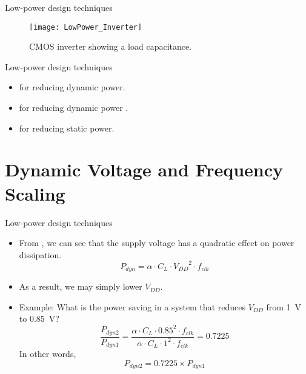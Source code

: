 \documentclass[]{slides}
\begin{document}
\begin{frame}{Low-power design techniques}{}
\begin{figure}
\texttt{[image: LowPower\_Inverter]}
\caption{\acs{CMOS} inverter showing a load capacitance.}
\label{Figure:CMOS_inverter}
\end{figure}
\end{frame}

\begin{frame}{Low-power design techniques}{}
\begin{itemize}
\item {} for reducing dynamic power.
\item {} for reducing dynamic power .
\item {} for reducing static power.
\end{itemize}
\end{frame}

\section{Dynamic Voltage and Frequency Scaling}
\begin{frame}{Low-power design techniques}{}
\begin{itemize}
\item From , we can see that the supply voltage has a quadratic effect on power dissipation.
\begin{equation*}
P_{dyn} = \alpha \cdot C_{L} \cdot {V_{DD}}^{2} \cdot f_{clk}
\end{equation*}
\item[]As a result, we may simply lower $V_{DD}$.
\item Example: What is the power saving in a system that reduces $V_{DD}$ from 1~V to 0.85~V?
\pause
\begin{equation*}
\frac{P_{dyn2}}{P_{dyn1}} = \frac{\alpha \cdot C_{L} \cdot 0.85^{2} \cdot f_{clk}}{\alpha \cdot C_{L} \cdot 1^{2} \cdot f_{clk}} = 0.7225
\end{equation*}
In other words,
\begin{equation*}
P_{dyn2}= 0.7225 \times P_{dyn1} 
\end{equation*}
\end{itemize}
\end{frame}
\end{document}
